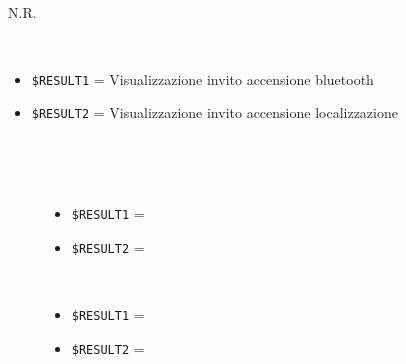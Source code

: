\documentclass[../../SperimentazioniPratiche.tex]{subfiles}
\begin{document}
			\begin{tcolorbox}[fonttitle=\bfseries, 
								adjusted title={\Large Prova 8A.1}, 
								breakable, 
								sharp corners=south,
								colback=white, 
								colframe=white!60!black]
								
				\begin{description}[leftmargin=0.7cm,labelwidth=!]
				
					\item[Input] \ \par 
        				N.R.
        				
        			\tcbline 
        				
        			\item[Output atteso] \ \par
        				\begin{itemize}
        					\item \verb|$RESULT1| = Visualizzazione invito accensione bluetooth
        					\item \verb|$RESULT2| = Visualizzazione invito accensione localizzazione
        				\end{itemize}

					\tcbline        				
        				
        			\item[Output riscontrato] \ \par
        				\begin{description}
        				
        					\item[\dispositivoA] \ \par
        					\begin{itemize}
        						\item \verb|$RESULT1| = \ok
        						\item \verb|$RESULT2| = \ok
        					\end{itemize}      					
        					
        					\item[\dispositivoB] \ \par
        					\begin{itemize}
        						\item \verb|$RESULT1| = \ok
        						\item \verb|$RESULT2| = \ok
        					\end{itemize}
        					
        				\end{description}
        				
				\end{description}  
				
			\end{tcolorbox}
\end{document}
